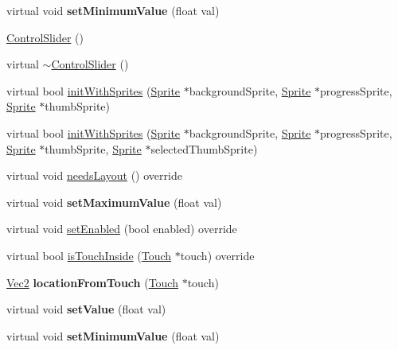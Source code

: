 \begin{DoxyCompactItemize}
virtual void {\bfseries set\+Minimum\+Value} (float val)
\item 
\hyperlink{classControlSlider_af60057476d259e3dc89990a5c04509dc}{Control\+Slider} ()
\item 
virtual \hyperlink{classControlSlider_a1ad8858f20d08fc63cb1a16583fb56f2}{$\sim$\+Control\+Slider} ()
\item 
virtual bool \hyperlink{classControlSlider_ae53f1a98788f9e1dc26e93c372283e5a}{init\+With\+Sprites} (\hyperlink{classSprite}{Sprite} $\ast$background\+Sprite, \hyperlink{classSprite}{Sprite} $\ast$progress\+Sprite, \hyperlink{classSprite}{Sprite} $\ast$thumb\+Sprite)
\item 
virtual bool \hyperlink{classControlSlider_a090ac715a67eda1f4db73e0db8c083a0}{init\+With\+Sprites} (\hyperlink{classSprite}{Sprite} $\ast$background\+Sprite, \hyperlink{classSprite}{Sprite} $\ast$progress\+Sprite, \hyperlink{classSprite}{Sprite} $\ast$thumb\+Sprite, \hyperlink{classSprite}{Sprite} $\ast$selected\+Thumb\+Sprite)
\item 
virtual void \hyperlink{classControlSlider_a52ab7abbbcefc12704917d04dfea67c9}{needs\+Layout} () override
\item 
\mbox{\label{classControlSlider_ab43748a3731302b6eacb74de43ffb528}} 
virtual void {\bfseries set\+Maximum\+Value} (float val)
\item 
virtual void \hyperlink{classControlSlider_ad02c5f0f4382a9780f215e3568757c2b}{set\+Enabled} (bool enabled) override
\item 
virtual bool \hyperlink{classControlSlider_adb6f9deedd5830443e3560db6ab21020}{is\+Touch\+Inside} (\hyperlink{classTouch}{Touch} $\ast$touch) override
\item 
\mbox{\label{classControlSlider_ab3ca93257d357d51795b812064edc734}} 
\hyperlink{classVec2}{Vec2} {\bfseries location\+From\+Touch} (\hyperlink{classTouch}{Touch} $\ast$touch)
\item 
\mbox{\label{classControlSlider_a044ce585ca974e0fa6d2f5228d6937f7}} 
virtual void {\bfseries set\+Value} (float val)
\item 
\mbox{\label{classControlSlider_a0e8e9c4b6aba70990432c5a78775b21f}} 
virtual void {\bfseries set\+Minimum\+Value} (float val)
\end{DoxyCompactItemize}
